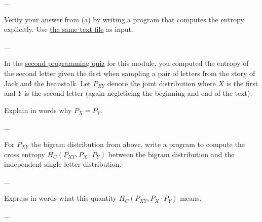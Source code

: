 \documentclass[a4paper,10pt]{article}
\begin{document}
\begin{solution}
...
\end{solution}

\begin{subproblem}{3}
Verify your answer from (a) by writing a program that computes the entropy explicitly. Use \href{https://raw.githubusercontent.com/cschaffner/InformationTheory/master/2019/Text/Jack.txt}{the same text file} as input.
\end{subproblem}

\begin{solution}
...
\end{solution}

\begin{subproblem}{1}
In the \href{https://canvas.uva.nl/courses/10933/assignments/72715}{second programming quiz} for this module, you computed the entropy of the second letter given the first when sampling a pair of letters from the story of Jack and the beanstalk. Let $P_{XY}$ denote the joint distribution where $X$ is the first and $Y$ is the second letter (again negleticing the beginning and end of the text).

Explain in words why $P_X = P_Y$.
\end{subproblem}

\begin{solution}
...
\end{solution}

\begin{subproblem}{2}
For $P_{XY}$ the bigram distribution from above, write a program to compute the cross entropy $H_C(P_{XY} , P_X \cdot P_Y)$ between the bigram distribution and the independent single-letter distribution.
\end{subproblem}

\begin{solution}
...
\end{solution}

\begin{subproblem}{1}
Express in words what this quantity  $H_C(P_{XY} , P_X \cdot P_Y)$ means.
\end{subproblem}

\begin{solution}
...
\end{solution}
\end{document}
